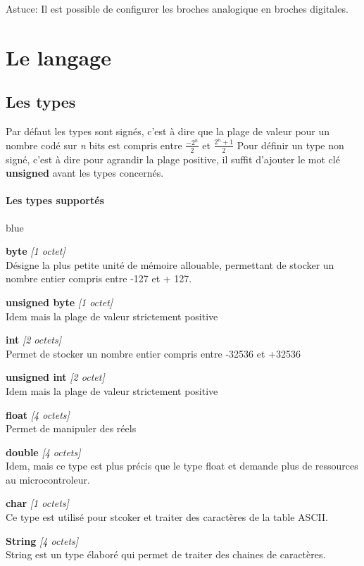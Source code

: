 Astuce: Il est possible de configurer les broches analogique en broches digitales. 

\chapter{Le langage}

\section{Les types}


Par défaut les types sont signés, c'est à dire que la plage de valeur pour un nombre codé sur \emph{n} bits est compris entre $ \frac{-2^n}{2} $ et $ \frac{2^n+1}{2} $ 
Pour définir un type non signé, c'est à dire pour agrandir la plage positive, il suffit d'ajouter le mot clé \textbf{unsigned} avant les types concernés.

\subsubsection{Les types supportés}

\begin{items}{blue}{\Triangle}
\item \textbf{byte} \textit{[1 octet]} \\
Désigne la plus petite unité de mémoire allouable, permettant de stocker un nombre entier compris entre -127 et + 127.
\item \textbf{unsigned byte} \textit{[1 octet]} \\
Idem mais la plage de valeur strictement positive

\item \textbf{int}    \textit{[2 octets]} \\
Permet de stocker un nombre entier compris entre -32536 et +32536
\item \textbf{unsigned int} \textit{[2 octet]} \\
Idem mais la plage de valeur strictement positive

\item \textbf{float}  \textit{[4 octets]} \\
Permet de manipuler des réels
\item \textbf{double} \textit{[4 octets]} \\
Idem, mais ce type est plus précis que le type float et demande plus de ressources au microcontroleur. 

\item \textbf{char} \textit{[1 octets]} \\
Ce type est utilisé pour stcoker et traiter des caractères de la table ASCII.\@
\item \textbf{String} \textit{[4 octets]} \\
String est un type élaboré qui permet de traiter des chaines de caractères.
\end{items}

